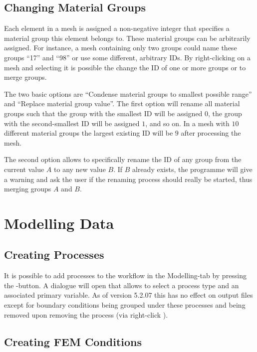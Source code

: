 \subsection{Changing Material Groups}

Each element in a mesh is assigned a non-negative integer that specifies a material group this element belongs to. These material groups can be arbitrarily assigned. For instance, a mesh containing only two groups could name these groups ``17'' and ``98'' or use some different, arbitrary IDs. By right-clicking on a mesh and selecting  it is possible the change the ID of one or more groups or to merge groups.

The two basic options are ``Condense material groups to smallest possible range'' and ``Replace material group value''. The first option will rename all material groups such that the group with the smallest ID will be assigned $0$, the group with the second-smallest ID will be assigned $1$, and so on. In a mesh with $10$ different material groups the largest existing ID will be $9$ after processing the mesh.

The second option allows to specifically rename the ID of any group from the current value $A$ to any new value $B$. If $B$ already exists, the programme will give a warning and ask the user if the renaming process should really be started, thus merging groups $A$ and $B$.

\section{Modelling Data}

\subsection{Creating Processes}

It is possible to add processes to the workflow in the Modelling-tab by pressing the -button. A dialogue will open that allows to select a process type and an associated primary variable. As of version 5.2.07 this has no effect on output files except for boundary conditions being grouped under these processes and being removed upon removing the process (via right-click ).

\subsection{Creating FEM Conditions}

